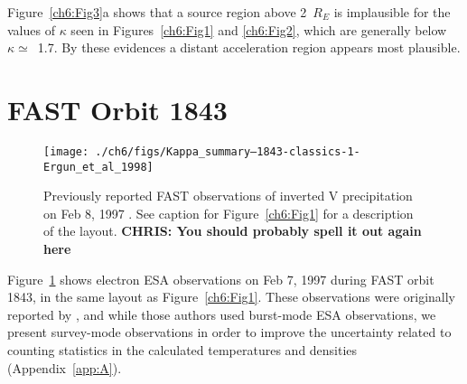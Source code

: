   Figure~\ref{ch6:Fig3}a shows that a source region above 2~$R_E$ is implausible
  for the values of $\kappa$ seen in Figures~\ref{ch6:Fig1} and \ref{ch6:Fig2},
  which are generally below $\kappa \simeq$~1.7. By these evidences a distant
  acceleration region appears most plausible.





  
  \section{FAST Orbit 1843}


  \begin{figure}
    \centering
    \noindent\texttt{[image: ./ch6/figs/Kappa\_summary--1843-classics-1-Ergun\_et\_al\_1998]}
    \caption[Inverted V precipitation and best-fit Maxwellian and kappa
    distribution parameters (Orbit 1843)]{Previously reported FAST observations
      of inverted V precipitation on Feb 8, 1997
      \citep{Ergun1998a,Ergun1998}. See caption for Figure~\ref{ch6:Fig1} for a
      description of the layout. \textbf{CHRIS: You should probably spell it out
        again here}}
    \label{ch6:Fig4}
  \end{figure}


  Figure~\ref{ch6:Fig4} shows electron ESA observations on Feb 7, 1997 during
  FAST orbit 1843, in the same layout as Figure~\ref{ch6:Fig1}. These
  observations were originally reported by \citet{Ergun1998a,Ergun1998}, and
  while those authors used burst-mode ESA observations, we present survey-mode
  observations in order to improve the uncertainty related to counting
  statistics in the calculated temperatures and densities
  (Appendix~\ref{app:A}).

